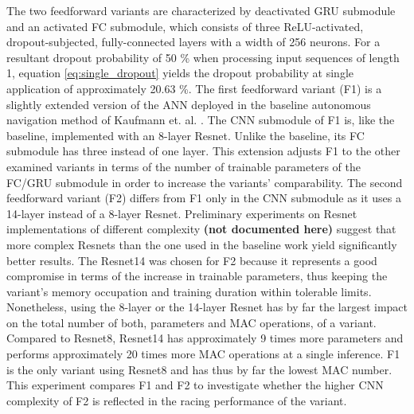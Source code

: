 The two feedforward variants 
are characterized by 
deactivated GRU submodule and an activated FC submodule,
which consists of three
ReLU-activated, dropout-subjected, fully-connected layers
with a width of 256 neurons.
For a resultant dropout probability of 50 \%
when processing input sequences of length 1,
equation \ref{eq:single_dropout} yields the dropout probability 
at single application of approximately 20.63 \%.
The first feedforward variant (F1)
is a slightly extended version of the ANN 
deployed in the baseline autonomous navigation method 
of Kaufmann et. al. \cite{Kaufmann2018}.
The CNN submodule of F1 is,
like the baseline, 
implemented with an 8-layer Resnet.
Unlike the baseline, its FC submodule 
has three instead of one layer.
This extension adjusts F1
to the other examined variants in terms of
the number of trainable parameters of the FC/GRU submodule
in order to increase the variants' comparability.
The second feedforward variant (F2) differs from F1
only in the CNN submodule
as it uses a 14-layer instead of a 8-layer Resnet.
Preliminary experiments on Resnet
implementations of different complexity
\textbf{(not documented here)}
suggest that more complex Resnets 
than the one used in the baseline work
yield significantly better results.
The Resnet14 was chosen for F2
because it represents a good compromise
in terms of the increase in trainable parameters,
thus keeping the variant's
memory occupation 
and training duration within tolerable limits.
Nonetheless, using the 8-layer or the 14-layer Resnet
has by far the largest impact on the 
total number of both, parameters and MAC operations, of a variant.
Compared to Resnet8, 
Resnet14 has approximately 
9 times more parameters and 
performs approximately 20 times more MAC operations
at a single inference.
F1 is the only variant using Resnet8
and has thus by far the lowest MAC number.
This experiment compares F1 and F2 
to investigate whether the higher CNN complexity of F2 
is reflected in the racing performance of the variant.


